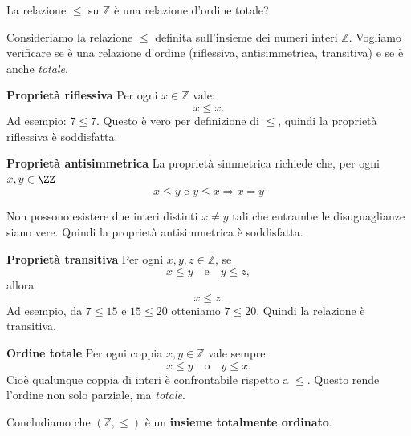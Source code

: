\begin{esempio}
La relazione $\leq$ su $\mathbb{Z}$ è una relazione d'ordine totale?
\medskip

\noindent Consideriamo la relazione \(\leq\) definita sull’insieme dei numeri interi \(\mathbb{Z}\).  
Vogliamo verificare se è una relazione d'ordine  (riflessiva, antisimmetrica, transitiva) e se è anche \emph{totale}.


\medskip
\textbf{Proprietà riflessiva}
Per ogni \(x \in \mathbb{Z}\) vale:
    \[
        x \leq x.
    \]
    Ad esempio: \(7 \leq 7\).  
    Questo è vero per definizione di \(\leq\), quindi la proprietà riflessiva è soddisfatta.
\medskip

    
\textbf{Proprietà antisimmetrica}
La proprietà simmetrica richiede che, per ogni \(x,y \in \ZZ\)
\[
    x \leq y \text{ e } y\leq x \Rightarrow x=y
\]

Non possono esistere due interi distinti \(x \neq y\) tali che entrambe le disuguaglianze siano vere.   Quindi la proprietà antisimmetrica è soddisfatta.
\medskip

\textbf{Proprietà transitiva} 
Per ogni \(x,y,z \in \mathbb{Z}\), se
    \[
        x \leq y \quad \text{e} \quad y \leq z,
    \]
    allora
    \[
        x \leq z.
    \]
    Ad esempio, da \(7 \leq 15\) e \(15 \leq 20\) otteniamo \(7 \leq 20\).  
    Quindi la relazione è transitiva.


 \textbf{Ordine totale}  
    Per ogni coppia \(x,y \in \mathbb{Z}\) vale sempre
    \[
        x \leq y \quad \text{o} \quad y \leq x.
    \]
    Cioè qualunque coppia di interi è confrontabile rispetto a \(\leq\).  
    Questo rende l'ordine non solo parziale, ma \emph{totale}.

Concludiamo che \((\mathbb{Z}, \leq)\) è un \textbf{insieme totalmente ordinato}.



\end{esempio}

